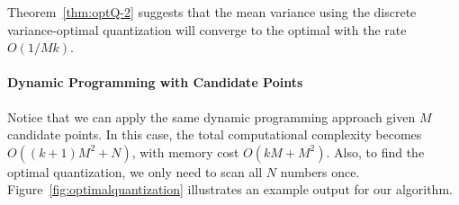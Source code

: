\documentclass{article}
\newcommand{\setI}{\mathcal{I}}
\begin{document}
Theorem~\ref{thm:optQ-2} suggests that the mean variance using the discrete variance-optimal quantization will converge to the optimal with the rate $O(1/Mk)$.

\paragraph*{Dynamic Programming with Candidate Points}
Notice that we can apply the same dynamic programming approach given $M$ candidate points. 
In this case, the total computational complexity becomes $O((k+1)M^2 + N)$, with memory cost 
$O(kM + M^2)$. Also, to find the optimal quantization,  we only need to scan all $N$ numbers once.
Figure~\ref{fig:optimalquantization} illustrates an example output for our algorithm.







\end{document}
